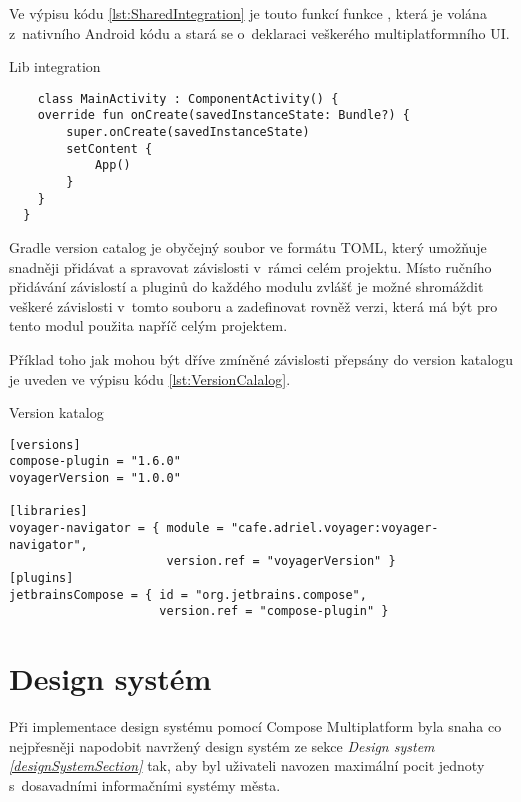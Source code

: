 Ve výpisu kódu \ref{lst:SharedIntegration} je touto funkcí funkce , která je volána z~nativního Android kódu a stará se
o~deklaraci veškerého multiplatformního UI.
\begin{listing}[H]
  \caption{Lib integration}\label{lst:SharedIntegration}
  \begin{verbatim}
    class MainActivity : ComponentActivity() {
    override fun onCreate(savedInstanceState: Bundle?) {
        super.onCreate(savedInstanceState)
        setContent {
            App()
        }
    }
  }
\end{verbatim}
\end{listing}






Gradle version catalog je obyčejný soubor ve formátu TOML, který umožňuje snadněji přidávat a spravovat závislosti v~rámci celém projektu. 
Místo ručního přidávání závislostí a pluginů do každého modulu zvlášť je možné shromáždit veškeré závislosti v~tomto souboru a zadefinovat rovněž
verzi, která má být pro tento modul použita napříč celým projektem. 

Příklad toho jak mohou být dříve zmíněné závislosti přepsány do version
katalogu je uveden ve výpisu kódu \ref{lst:VersionCalalog}.

\begin{listing}[H]
\caption{Version katalog}\label{lst:VersionCalalog}
\begin{verbatim}
[versions]
compose-plugin = "1.6.0"
voyagerVersion = "1.0.0"
    
[libraries]
voyager-navigator = { module = "cafe.adriel.voyager:voyager-navigator", 
                      version.ref = "voyagerVersion" }
[plugins]
jetbrainsCompose = { id = "org.jetbrains.compose",
                     version.ref = "compose-plugin" }
\end{verbatim}
\end{listing}



\section{Design systém} \label{designSystemImpl}
Při implementace design systému pomocí Compose Multiplatform byla snaha co nejpřesněji napodobit navržený design systém ze sekce 
\textit{Design system \ref{designSystemSection}}
tak, aby byl uživateli navozen maximální pocit jednoty s~dosavadními informačními systémy města.

